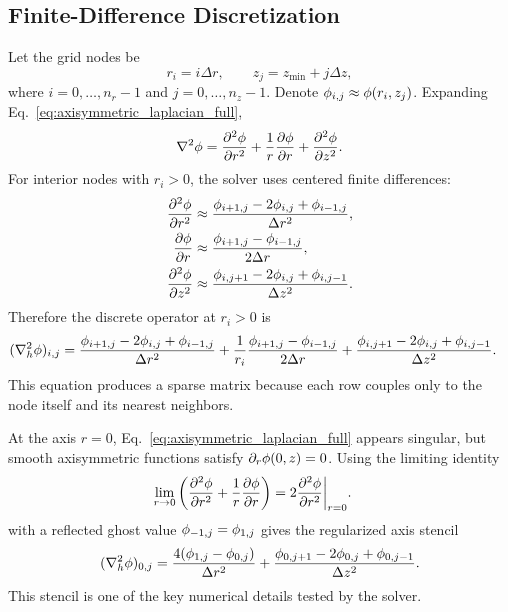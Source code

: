 \subsection{Finite-Difference Discretization}

Let the grid nodes be
\begin{equation}
    r_i=i\Delta r,\qquad z_j=z_{\min}+j\Delta z,
\end{equation}
where $i=0,\ldots,n_r-1$ and $j=0,\ldots,n_z-1$. Denote $\phi_{i,j}\approx \phi(r_i,z_j)$. Expanding Eq.~\eqref{eq:axisymmetric_laplacian_full},
\begin{equation}
    \nabla^2\phi = \frac{\partial^2\phi}{\partial r^2}+\frac{1}{r}\frac{\partial\phi}{\partial r}+\frac{\partial^2\phi}{\partial z^2}.
\end{equation}
For interior nodes with $r_i>0$, the solver uses centered finite differences:
\begin{align}
\frac{\partial^2\phi}{\partial r^2} &\approx
\frac{\phi_{i+1,j}-2\phi_{i,j}+\phi_{i-1,j}}{\Delta r^2},\\
\frac{\partial\phi}{\partial r} &\approx
\frac{\phi_{i+1,j}-\phi_{i-1,j}}{2\Delta r},\\
\frac{\partial^2\phi}{\partial z^2} &\approx
\frac{\phi_{i,j+1}-2\phi_{i,j}+\phi_{i,j-1}}{\Delta z^2}.
\end{align}
Therefore the discrete operator at $r_i>0$ is
\begin{align}
(\nabla_h^2\phi)_{i,j}
&=
\frac{\phi_{i+1,j}-2\phi_{i,j}+\phi_{i-1,j}}{\Delta r^2}
+\frac{1}{r_i}\frac{\phi_{i+1,j}-\phi_{i-1,j}}{2\Delta r}
+\frac{\phi_{i,j+1}-2\phi_{i,j}+\phi_{i,j-1}}{\Delta z^2}.\label{eq:interior_stencil}
\end{align}
This equation produces a sparse matrix because each row couples only to the node itself and its nearest neighbors.

At the axis $r=0$, Eq.~\eqref{eq:axisymmetric_laplacian_full} appears singular, but smooth axisymmetric functions satisfy $\partial_r\phi(0,z)=0$. Using the limiting identity
\begin{align}
    \lim_{r\to0}\left(\frac{\partial^2\phi}{\partial r^2}
    +\frac{1}{r}\frac{\partial\phi}{\partial r}\right)
    &=2\frac{\partial^2\phi}{\partial r^2}\bigg|_{r=0}.
\end{align}
with a reflected ghost value $\phi_{-1,j}=\phi_{1,j}$ gives the regularized axis stencil
\begin{equation}
(\nabla_h^2\phi)_{0,j}
=
\frac{4(\phi_{1,j}-\phi_{0,j})}{\Delta r^2}
+\frac{\phi_{0,j+1}-2\phi_{0,j}+\phi_{0,j-1}}{\Delta z^2}.
\label{eq:axis_stencil}
\end{equation}
This stencil is one of the key numerical details tested by the solver.


